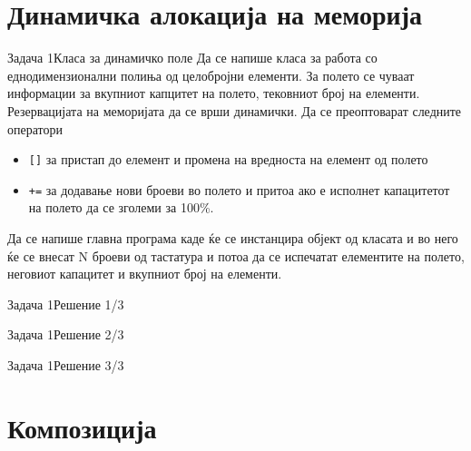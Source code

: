 \section{Динамичка алокација на меморија}

\begin{frame}{Задача 1}{Класа за динамичко поле}
Да се напише класа за работа со еднодимензионални полиња од целобројни елементи.
За полето се чуваат информации за вкупниот капцитет на полето, тековниот број на
елементи. Резервацијата на меморијата да се врши динамички. 
Да се преоптоварат следните оператори 
\begin{itemize}
  \item \texttt{[]} за пристап до елемент и промена на вредноста на
  елемент од полето
  \item \texttt{+=} за додавање нови броеви во полето и притоа ако е исполнет
  капацитетот на полето да се зголеми за 100\%.
\end{itemize}
Да се напише главна програма каде ќе се инстанцира објект од класата и во него
ќе се внесат N броеви од тастатура и потоа да се испечатат елементите на полето,
неговиот капацитет и вкупниот број на елементи.
\end{frame}

\begin{frame}[fragile]{Задача 1}{Решение 1/3}

\end{frame}

\begin{frame}[fragile,shrink=10]{Задача 1}{Решение 2/3}

\end{frame}

\begin{frame}[fragile,shrink=10]{Задача 1}{Решение 3/3}

\end{frame}

\section{Композиција}

